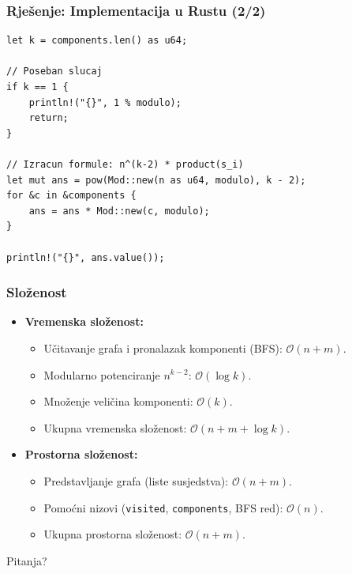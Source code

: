 \documentclass{beamer}
\begin{document}
\begin{frame}[fragile]
\frametitle{Rješenje: Implementacija u Rustu (2/2)}
\begin{lstlisting}
let k = components.len() as u64;

// Poseban slucaj
if k == 1 {
    println!("{}", 1 % modulo);
    return;
}

// Izracun formule: n^(k-2) * product(s_i)
let mut ans = pow(Mod::new(n as u64, modulo), k - 2);
for &c in &components {
    ans = ans * Mod::new(c, modulo);
}

println!("{}", ans.value());
\end{lstlisting}
\end{frame}

\begin{frame}
\frametitle{Složenost}
\begin{itemize}
    \item \textbf{Vremenska složenost:} 
    \begin{itemize}
        \item Učitavanje grafa i pronalazak komponenti (BFS): $\mathcal{O}(n + m)$.
        \item Modularno potenciranje $n^{k-2}$: $\mathcal{O}(\log k)$.
        \item Množenje veličina komponenti: $\mathcal{O}(k)$.
        \item Ukupna vremenska složenost: $\mathcal{O}(n + m + \log k)$.
    \end{itemize}
    \item \textbf{Prostorna složenost:} 
    \begin{itemize}
        \item Predstavljanje grafa (liste susjedstva): $\mathcal{O}(n + m)$.
        \item Pomoćni nizovi (\texttt{visited}, \texttt{components}, BFS red): $\mathcal{O}(n)$.
        \item Ukupna prostorna složenost: $\mathcal{O}(n + m)$.
    \end{itemize}
\end{itemize}
\end{frame}

\begin{frame}
\begin{center}
    \Huge Pitanja?
\end{center}
\end{frame}
\end{document}
